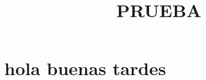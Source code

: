 \documentclass[10pt, a4paper, twocolumn]{article}
\title{PRUEBA}
\begin{document}
\maketitle
\section{hola buenas tardes}
\end{document}
